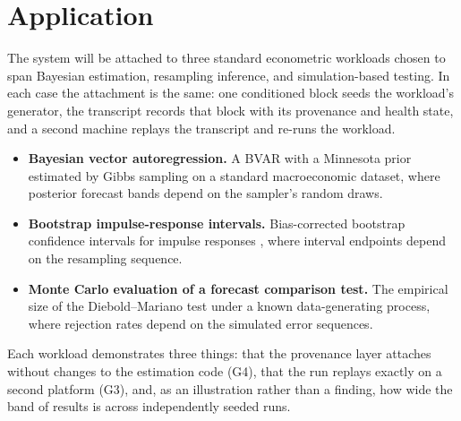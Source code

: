 \section{Application}
 
The system will be attached to three standard econometric workloads chosen to span
Bayesian estimation, resampling inference, and simulation-based testing. In each case
the attachment is the same: one conditioned block seeds the workload's generator, the
transcript records that block with its provenance and health state, and a second
machine replays the transcript and re-runs the workload.
 
\begin{itemize}
  \item \textbf{Bayesian vector autoregression.} A BVAR with a Minnesota prior
        \citep{litterman1986} estimated by Gibbs sampling on a standard macroeconomic
        dataset, where posterior forecast bands depend on the sampler's random draws.
  \item \textbf{Bootstrap impulse-response intervals.} Bias-corrected bootstrap
        confidence intervals for impulse responses \citep{kilian1998}, where interval
        endpoints depend on the resampling sequence.
  \item \textbf{Monte Carlo evaluation of a forecast comparison test.} The empirical
        size of the Diebold--Mariano test \citep{diebold1995} under a known data-generating
        process, where rejection rates depend on the simulated error sequences.
\end{itemize}
 
Each workload demonstrates three things: that the provenance layer attaches without
changes to the estimation code (G4), that the run replays exactly on a second platform
(G3), and, as an illustration rather than a finding, how wide the band of results is
across independently seeded runs.